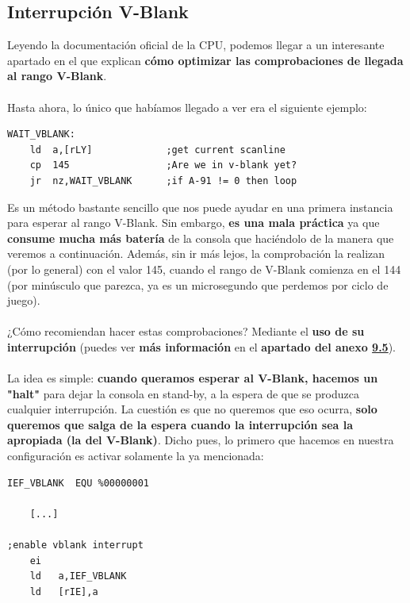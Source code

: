 \subsection{Interrupción V-Blank}

Leyendo la documentación oficial de la CPU, podemos llegar a un interesante apartado en el que explican \textbf{cómo optimizar las comprobaciones de llegada al rango V-Blank}.
\\ \\
Hasta ahora, lo único que habíamos llegado a ver era el siguiente ejemplo:

\begin{lstlisting}[caption={Espera al rango V-Blank: Método 1}, label={code:vblank1}]
WAIT_VBLANK:
	ld	a,[rLY]				;get current scanline
	cp	145					;Are we in v-blank yet?
	jr	nz,WAIT_VBLANK		;if A-91 != 0 then loop
\end{lstlisting}

Es un método bastante sencillo que nos puede ayudar en una primera instancia para esperar al rango V-Blank. Sin embargo, \textbf{es una mala práctica} ya que \textbf{consume mucha más batería} de la consola que haciéndolo de la manera que veremos a continuación. Además, sin ir más lejos, la comprobación la realizan (por lo general) con el valor 145, cuando el rango de V-Blank comienza en el 144 (por minúsculo que parezca, ya es un microsegundo que perdemos por ciclo de juego).
\\ \\
¿Cómo recomiendan hacer estas comprobaciones? Mediante el \textbf{uso de su interrupción} (puedes ver \textbf{más información} en el \textbf{apartado del anexo \textbf{\hyperref[anexo:interruptions]{9.5}}}).
\\ \\
La idea es simple: \textbf{cuando queramos esperar al V-Blank, hacemos un "halt"} para dejar la consola en stand-by, a la espera de que se produzca cualquier interrupción. La cuestión es que no queremos que eso ocurra, \textbf{solo queremos que salga de la espera cuando la interrupción sea la apropiada (la del V-Blank)}. Dicho pues, lo primero que hacemos en nuestra configuración es activar solamente la ya mencionada:

\begin{lstlisting}[caption={Activar Interrupción V-Blank}, label={code:enable_vblank}]
IEF_VBLANK 	EQU %00000001

	[...]

;enable vblank interrupt
 	ei
	ld   a,IEF_VBLANK
	ld   [rIE],a
\end{lstlisting}


